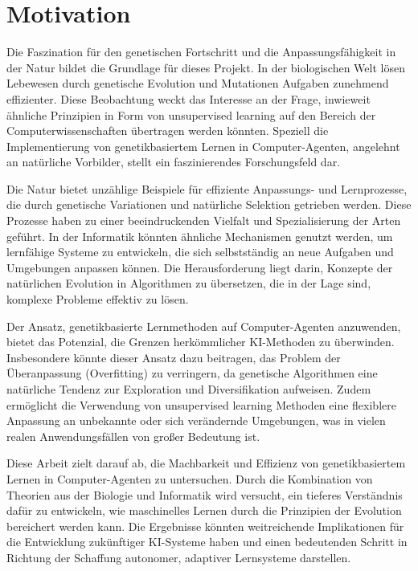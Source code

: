 \chapter{Motivation}
\label{chapter:1}
Die Faszination für den genetischen Fortschritt und die Anpassungsfähigkeit in der Natur bildet die Grundlage für dieses Projekt. In der biologischen Welt lösen Lebewesen durch genetische Evolution und Mutationen Aufgaben zunehmend effizienter. Diese Beobachtung weckt das Interesse an der Frage, inwieweit ähnliche Prinzipien in Form von unsupervised learning auf den Bereich der Computerwissenschaften übertragen werden könnten. Speziell die Implementierung von genetikbasiertem Lernen in Computer-Agenten, angelehnt an natürliche Vorbilder, stellt ein faszinierendes Forschungsfeld dar.

Die Natur bietet unzählige Beispiele für effiziente Anpassungs- und Lernprozesse, die durch genetische Variationen und natürliche Selektion getrieben werden. Diese Prozesse haben zu einer beeindruckenden Vielfalt und Spezialisierung der Arten geführt. In der Informatik könnten ähnliche Mechanismen genutzt werden, um lernfähige Systeme zu entwickeln, die sich selbstständig an neue Aufgaben und Umgebungen anpassen können. Die Herausforderung liegt darin, Konzepte der natürlichen Evolution in Algorithmen zu übersetzen, die in der Lage sind, komplexe Probleme effektiv zu lösen.

Der Ansatz, genetikbasierte Lernmethoden auf Computer-Agenten anzuwenden, bietet das Potenzial, die Grenzen herkömmlicher KI-Methoden zu überwinden. Insbesondere könnte dieser Ansatz dazu beitragen, das Problem der Überanpassung (Overfitting) zu verringern, da genetische Algorithmen eine natürliche Tendenz zur Exploration und Diversifikation aufweisen. Zudem ermöglicht die Verwendung von unsupervised learning Methoden eine flexiblere Anpassung an unbekannte oder sich verändernde Umgebungen, was in vielen realen Anwendungsfällen von großer Bedeutung ist.

Diese Arbeit zielt darauf ab, die Machbarkeit und Effizienz von genetikbasiertem Lernen in Computer-Agenten zu untersuchen. Durch die Kombination von Theorien aus der Biologie und Informatik wird versucht, ein tieferes Verständnis dafür zu entwickeln, wie maschinelles Lernen durch die Prinzipien der Evolution bereichert werden kann. Die Ergebnisse könnten weitreichende Implikationen für die Entwicklung zukünftiger KI-Systeme haben und einen bedeutenden Schritt in Richtung der Schaffung autonomer, adaptiver Lernsysteme darstellen.




